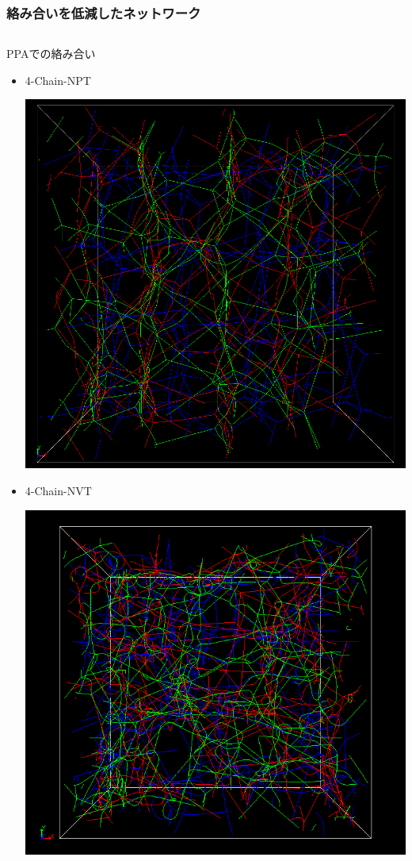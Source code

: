 \documentclass[12pt, dvipdfmx]{beamer}
\begin{document}
\begin{frame}
\begin{columns}[T, onlytextwidth]
		\end{columns}
\end{frame}

\begin{frame}
    \frametitle{絡み合いを低減したネットワーク}
        \vspace{-3mm}
		\begin{columns}[T, onlytextwidth]
			\begin{exampleblock}{PPAでの絡み合い}
				\small
				\begin{itemize}
					\item 4-Chain-\alert{NPT}
					
					\includegraphics[width=.58\textwidth]{NPT_PPA.png}
					\item 4-Chain-NVT
					
					\includegraphics[width=.58\textwidth]{N48_f4_PPA.png}
				\end{itemize}
			\end{exampleblock}
                

\end{columns}
\end{frame}
\end{document}
